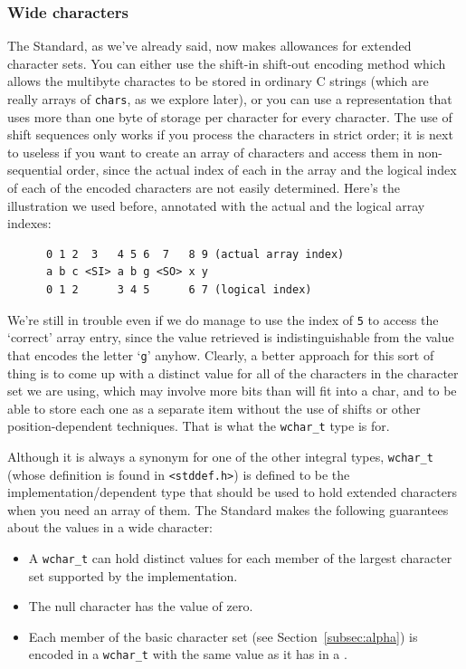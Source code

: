    

   \subsubsection{Wide characters}
    

    The Standard, as we've already said, now makes allowances for extended
     character sets. You can either use the shift-in shift-out encoding method
     which allows the multibyte charactes to be stored in ordinary C strings
     (which are really arrays of \texttt{chars}, as we explore later), or
     you can use a representation that uses more than one byte of storage per
     character for every character. The use of shift sequences only works if
     you process the characters in strict order; it is next to useless if you
     want to create an array of characters and access them in non-sequential
     order, since the actual index of each \kchar{} in the array and
     the logical index of each of the encoded characters are not easily
     determined. Here's the illustration we used before, annotated with the
     actual and the logical array indexes:


    \begin{Verbatim}
      0 1 2  3   4 5 6  7   8 9 (actual array index)
      a b c <SI> a b g <SO> x y
      0 1 2      3 4 5      6 7 (logical index)
    \end{Verbatim}

    We're still in trouble even if we do manage to use the index
     of \texttt{5} to access the `correct' array entry, since
     the value retrieved is indistinguishable from the value that encodes the
     letter `\texttt{g}' anyhow. Clearly, a better approach for
     this sort of thing is to come up with a distinct value for all of the
     characters in the character set we are using, which may involve more bits
     than will fit into a char, and to be able to store each one as a separate
     item without the use of shifts or other position-dependent techniques.
     That is what the \texttt{wchar\_t} type is for.


     Although it is always a synonym for one of the other integral types,
     \texttt{wchar\_t} (whose definition is found in
     \texttt{<stddef.h>}) is defined to be the
     implementation\-/dependent type that should be used to hold extended
     characters when you need an array of them. The Standard makes the
     following guarantees about the values in a wide character:


    \begin{itemize}
     \item A \texttt{wchar\_t} can hold distinct values for each member of
      the largest character set supported by the implementation.

     \item The null character has the value of zero.

     \item Each member of the basic character set
       (see Section~\ref{subsec:alpha})
       is encoded in a \texttt{wchar\_t} with the same value
       as it has in a \kchar.
    \end{itemize}

